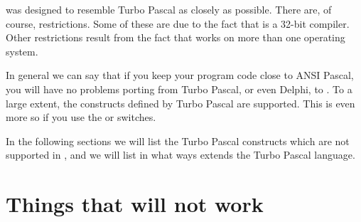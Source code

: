 \fpc was designed to resemble Turbo Pascal as closely as possible. There
are, of course, restrictions. Some of these are due to the fact that \fpc is
a 32-bit compiler. Other restrictions result from the fact that \fpc works
on more than one operating system.

In general we can say that if you keep your program code close to ANSI
Pascal, you will have no problems porting from Turbo Pascal, or even Delphi, to
\fpc. To a large extent, the constructs defined by Turbo Pascal are
supported. This is even more so if you use the  or 
switches.

In the following sections we will list the Turbo Pascal constructs which are
not supported in \fpc, and we will list in what ways \fpc extends the Turbo
Pascal language.


\section{Things that will not work}

